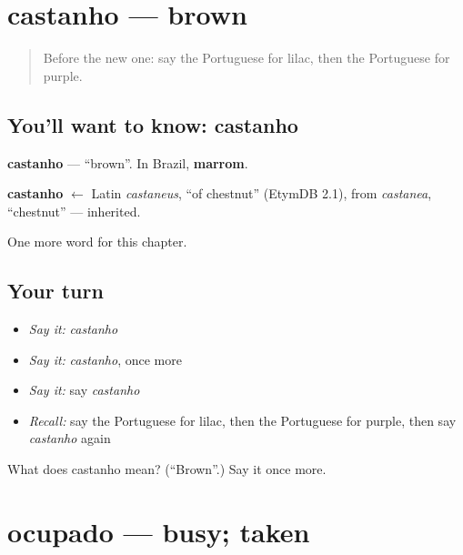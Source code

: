 \section[castanho]{castanho — brown}

\label{lesson:PT-C121-castanho}



\begin{quote}
Before the new one: say the Portuguese for lilac, then the Portuguese for purple.
\end{quote}

\subsection*{You'll want to know: castanho}
\textbf{castanho} — \textquotedblleft{}brown\textquotedblright{}. In Brazil, \textbf{marrom}.

\begin{cousinweb}
\textbf{castanho} $\leftarrow$ Latin \emph{castaneus}, \textquotedblleft{}of chestnut\textquotedblright{} (EtymDB 2.1), from \emph{castanea}, \textquotedblleft{}chestnut\textquotedblright{} — inherited.
\end{cousinweb}

\begin{grammarlens}[title={What you've built}]
One more word for this chapter.
\end{grammarlens}

\subsection*{Your turn}
\begin{itemize}
\raggedright
  \item \emph{Say it:} \emph{castanho}
  \item \emph{Say it:} \emph{castanho}, once more
  \item \emph{Say it:} say \emph{castanho}
  \item \emph{Recall:} say the Portuguese for lilac, then the Portuguese for purple, then say \emph{castanho} again
\end{itemize}

\begin{tcolorbox}[breakable,colback=teal!4,colframe=teal!35!black,title={Before you move on}]
What does castanho mean? (\textquotedblleft{}Brown\textquotedblright{}.) Say it once more.
\end{tcolorbox}
\section[ocupado]{ocupado — busy; taken}

